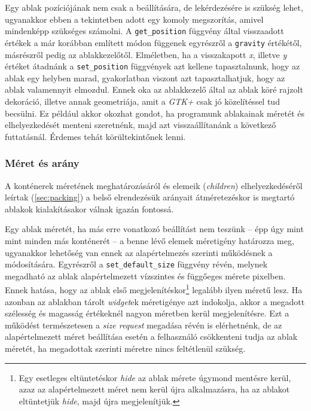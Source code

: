 Egy ablak pozíciójának nem csak a beállítására, de lekérdezésére is szükség lehet, ugyanakkor ebben a tekintetben adott egy komoly megszorítás, amivel mindenképp szükséges számolni. A \texttt{get\_position} függvény által visszaadott értékek a már korábban említett módon függenek egyrészről a \texttt{gravity} értékétől, másrészről pedig az ablakkezelőtől. Elméletben, ha a visszakapott \textit{x}, illetve \textit{y} értéket átadnánk a \texttt{set\_position} függvények azt kellene tapasztalnunk, hogy az ablak egy helyben marad, gyakorlatban viszont azt tapasztalhatjuk, hogy az ablak valamennyit elmozdul. Ennek oka az ablakkezelő által az ablak köré rajzolt dekoráció, illetve annak geometriája, amit a \textit{GTK+} csak jó közelítéssel tud becsülni. Ez például akkor okozhat gondot, ha programunk ablakainak méretét és elhelyezkedését menteni szeretnénk, majd azt visszaállítanánk a következő futtatásnál. Érdemes tehát körültekintőnek lenni.

\subsubsection{Méret és arány}

A konténerek méretének meghatározásáról és elemeik (\textit{children}) elhelyezkedéséről leírtak (\ref{sec:packing}) a belső elrendezésük arányait átméretezéskor is megtartó ablakok kialakításakor válnak igazán fontossá.

Egy ablak méretét, ha más erre vonatkozó beállítást nem teszünk -- épp úgy mint mint minden más konténerét -- a benne lévő elemek méretigény határozza meg, ugyanakkor lehetőség van ennek az alapértelmezés szerinti működésnek a módosítására. Egyrészről a \texttt{set\_default\_size} függvény révén, melynek megadható az ablak alapértelmezett vízszintes és függőeges mérete pixelben. Ennek hatása, hogy az ablak első megjelenítéskor\footnote{Egy esetleges eltüntetéskor \textit{hide} az ablak mérete úgymond mentésre kerül, azaz az alapértelmezett méret nem kerül újra alkalmazásra, ha az ablakot eltüntetjük \textit{hide}, majd újra megjelenítjük.} legalább ilyen méretű lesz. Ha azonban az ablakban tárolt \textit{widget}ek méretigénye azt indokolja, akkor a megadott szélesség és magasság értékeknél nagyon méretben kerül megjelenítésre. Ezt a működést természetesen a \textit{size request} megadása révén is elérhetnénk, de az alapértelmezett méret beállítása esetén a felhasználó csökkenteni tudja az ablak méretét, ha megadottak szerinti méretre nincs feltétlenül szükség.

